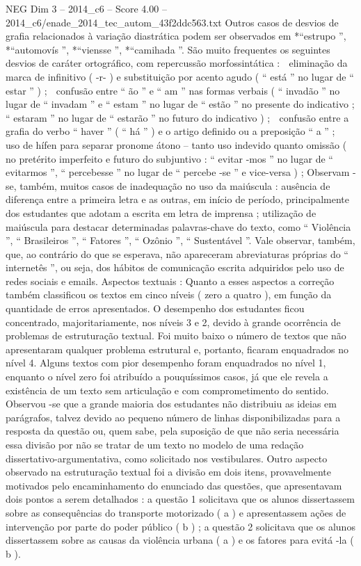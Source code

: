 \begin{textsample}{NEG Dim 3 – 2014\_c6 – Score 4.00 – 2014\_c6/enade\_2014\_tec\_autom\_43f2ddc563.txt}
Outros casos de desvios de grafia relacionados à variação diastrática podem ser observados em *“estrupo ”, *“automovís ”, *“viensse ”, *“camihada ”.
São muito frequentes os seguintes desvios de caráter ortográfico, com repercussão morfossintática :  eliminação da marca de infinitivo ( -r- ) e substituição por acento agudo ( “ está ” no lugar de “ estar ” ) ;  confusão entre “ ão ” e “ am ” nas formas verbais ( “ invadão ” no lugar de “ invadam ” e “ estam ” no lugar de “ estão ” no presente do indicativo ; “ estaram ” no lugar de “ estarão ” no futuro do indicativo ) ;  confusão entre a grafia do verbo “ haver ” ( “ há ” ) e o artigo definido ou a preposição “ a ” ;  uso de hífen para separar pronome átono – tanto uso indevido quanto omissão ( no pretérito imperfeito e futuro do subjuntivo : “ evitar -mos ” no lugar de “ evitarmos ”, “ percebesse ” no lugar de “ percebe -se ” e vice-versa ) ; Observam -se, também, muitos casos de inadequação no uso da maiúscula : ausência de diferença entre a primeira letra e as outras, em início de período, principalmente dos estudantes que adotam a escrita em letra de imprensa ; utilização de maiúscula para destacar determinadas palavras-chave do texto, como “ Violência ”, “ Brasileiros ”, “ Fatores ”, “ Ozônio ”, “ Sustentável ”.
Vale observar, também, que, ao contrário do que se esperava, não apareceram abreviaturas próprias do “ internetês ”, ou seja, dos hábitos de comunicação escrita adquiridos pelo uso de redes sociais e emails.
Aspectos textuais : Quanto a esses aspectos a correção também classificou os textos em cinco níveis ( zero a quatro ), em função da quantidade de erros apresentados.
O desempenho dos estudantes ficou concentrado, majoritariamente, nos níveis 3 e 2, devido à grande ocorrência de problemas de estruturação textual.
Foi muito baixo o número de textos que não apresentaram qualquer problema estrutural e, portanto, ficaram enquadrados no nível 4.
Alguns textos com pior desempenho foram enquadrados no nível 1, enquanto o nível zero foi atribuído a pouquíssimos casos, já que ele revela a existência de um texto sem articulação e com comprometimento do sentido.
Observou -se que a grande maioria dos estudantes não distribuiu as ideias em parágrafos, talvez devido ao pequeno número de linhas disponibilizadas para a resposta da questão ou, quem sabe, pela suposição de que não seria necessária essa divisão por não se tratar de um texto no modelo de uma redação dissertativo-argumentativa, como solicitado nos vestibulares.
Outro aspecto observado na estruturação textual foi a divisão em dois itens, provavelmente motivados pelo encaminhamento do enunciado das questões, que apresentavam dois pontos a serem detalhados : a questão 1 solicitava que os alunos dissertassem sobre as consequências do transporte motorizado ( a ) e apresentassem ações de intervenção por parte do poder público ( b ) ; a questão 2 solicitava que os alunos dissertassem sobre as causas da violência urbana ( a ) e os fatores para evitá -la ( b ).

\end{textsample}
